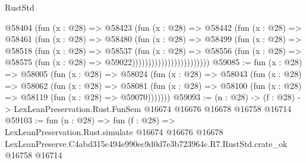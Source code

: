 \begin{lexlean}{RustStd}
\begin{coremodule}
                              @58404
                                (fun (x : @28) =>
                                @58423
                                  (fun (x : @28) =>
                                  @58442
                                    (fun (x : @28) =>
                                    @58461
                                      (fun (x : @28) =>
                                      @58480
                                        (fun (x : @28) =>
                                        @58499
                                          (fun (x : @28) =>
                                          @58518
                                            (fun (x : @28) =>
                                            @58537
                                              (fun (x : @28) =>
                                              @58556
                                                (fun (x : @28) =>
                                                @58575
                                                  (fun (x : @28) => @59022))))))))))))))))))))))))
@59085 := fun (x : @28) =>
  @58005
    (fun (x : @28) =>
    @58024
      (fun (x : @28) =>
      @58043
        (fun (x : @28) =>
        @58062
          (fun (x : @28) =>
          @58081 (fun (x : @28) => @58100 (fun (x : @28) => @58119 (fun (x : @28) => @59070)))))))
@59093 := (n : @28) ->
  (f : @28) -> LexLeanPreservation.Rust.FunSem @16674 @16676 @16678 @16758 @16714
@59103 := fun (n : @28) =>
  fun (f : @28) =>
  LexLeanPreservation.Rust.simulate
    @16674
    @16676
    @16678
    LexLeanPreserve.C4abd315c494e990ec9d0d7e3b723964c.R7.RustStd.crate_ok
    @16758
    @16714
\end{coremodule}
\end{lexlean}
